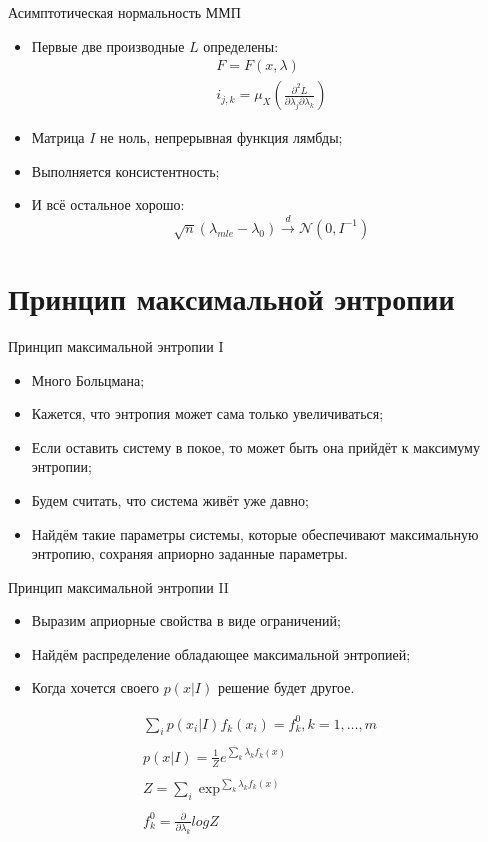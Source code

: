 \documentclass[14pt, fleqn, xcolor={dvipsnames, table}]{beamer}
\begin{document}
\begin{frame}{Асимптотическая нормальность ММП}
\begin{itemize}
  \item Первые две производные $L$ определены:
  $$\begin{array}{l}
    F = F(x, \lambda) \\
    i_{j,k} = \mu_X(\frac{\partial^2L}{\partial\lambda_j\partial\lambda_k})
  \end{array}$$
  \item Матрица $I$ не ноль, непрерывная функция лямбды;
  \item Выполняется консистентность;
  \item И всё остальное хорошо:
  $$
  \sqrt{n}(\lambda_{mle} - \lambda_0) \overset{d}{\to} \mathcal{N}(0, I^{-1})
  $$
\end{itemize}
\end{frame}
\section{Принцип максимальной энтропии}

\begin{frame}{Принцип максимальной энтропии I}
\begin{itemize}
  \item Много Больцмана;
  \item Кажется, что энтропия может сама только увеличиваться;
  \item Если оставить систему в покое, то может быть она прийдёт к максимуму энтропии;
  \item Будем считать, что система живёт уже давно;
  \item Найдём такие параметры системы, которые обеспечивают максимальную энтропию, сохраняя априорно заданные параметры.
\end{itemize}
\end{frame}


\begin{frame}{Принцип максимальной энтропии II}
\begin{itemize}
  \item Выразим априорные свойства в виде ограничений;
  \item Найдём распределение обладающее максимальной энтропией;
  \item Когда хочется своего $p(x|I)$ решение будет другое.
\end{itemize}
$$\begin{array}{l}
\sum_i p(x_i|I)f_k(x_i) = f_k^0, k = 1, \ldots, m \\
\\
p(x|I) = \frac{1}{Z}e^{\sum_k\lambda_kf_k(x)} \\
\\
Z = \sum_i\exp^{\sum_k\lambda_kf_k(x)} \\
\\
f_k^0 = \frac{\partial}{\partial\lambda_k}logZ
\end{array}$$
\end{frame}
\end{document}
